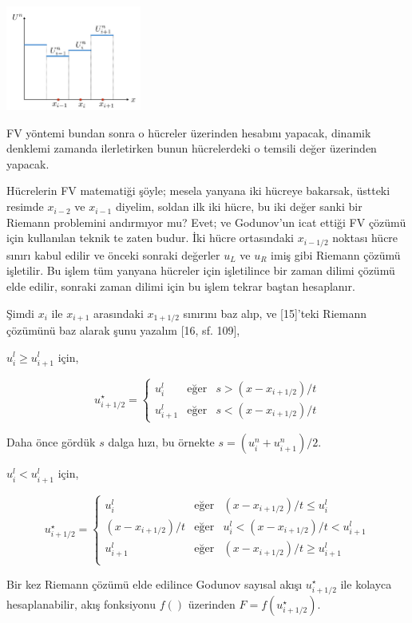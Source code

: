 \documentclass[12pt,fleqn]{article}\usepackage{../../common}
\begin{document}
\includegraphics[width=12em]{12-19-02.png}

FV yöntemi bundan sonra o hücreler üzerinden hesabını yapacak, dinamik denklemi
zamanda ilerletirken bunun hücrelerdeki o temsili değer üzerinden yapacak.

Hücrelerin FV matematiği şöyle; mesela yanyana iki hücreye bakarsak, üstteki
resimde $x_{i-2}$ ve $x_{i-1}$ diyelim, soldan ilk iki hücre, bu iki değer sanki
bir Riemann problemini andırmıyor mu? Evet; ve Godunov'un icat ettiği FV çözümü
için kullanılan teknik te zaten budur. İki hücre ortasındaki $x_{i-1/2}$ noktası
hücre sınırı kabul edilir ve önceki sonraki değerler $u_L$ ve $u_R$ imiş gibi
Riemann çözümü işletilir. Bu işlem tüm yanyana hücreler için işletilince bir
zaman dilimi çözümü elde edilir, sonraki zaman dilimi için bu işlem tekrar
baştan hesaplanır.

Şimdi $x_{i}$ ile $x_{i+1}$ arasındaki $x_{1+1/2}$ sınırını baz alıp, ve
[15]'teki Riemann çözümünü baz alarak şunu yazalım [16, sf. 109],

$u_i^l \ge u_{i+1}^l$ için,

$$
u^\star_{i+1/2} = 
\left\{ \begin{array}{lll}
u_i^l & \textrm{eğer} & s > (x-x_{i+1/2}) / t  \\
u_{i+1}^l & \textrm{eğer} & s < (x-x_{i+1/2}) / t
\end{array} \right.
$$

Daha önce gördük $s$ dalga hızı, bu örnekte $s = (u_i^n + u_{i+1}^n)/2$.

$u_i^l < u_{i+1}^l$ için,

$$
u^\star_{i+1/2} = 
\left\{ \begin{array}{lll}
u_i^l & \textrm{eğer} & (x-x_{i+1/2})/t \le u_i^l   \\
(x-x_{i+1/2})/t & \textrm{eğer} & u_i^l < (x-x_{i+1/2})/t < u_{i+1}^l   \\
u_{i+1}^l & \textrm{eğer} & (x-x_{i+1/2})/t \ge u_{i+1}^l   \\
\end{array} \right.
$$

Bir kez Riemann çözümü elde edilince Godunov sayısal akışı $u^\star_{i+1/2}$ ile
kolayca hesaplanabilir, akış fonksiyonu $f()$ üzerinden $F = f(u^\star_{i+1/2})$.
\end{document}
